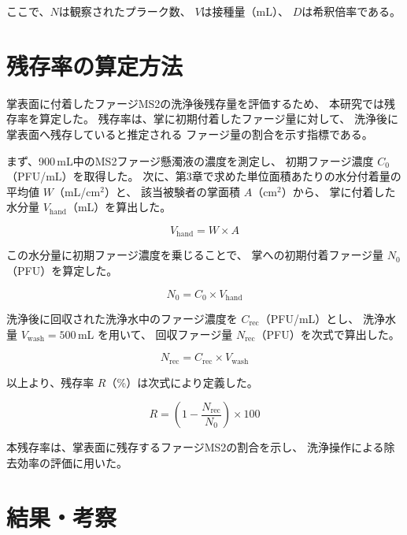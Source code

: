 ここで、$N$は観察されたプラーク数、
$V$は接種量（mL）、
$D$は希釈倍率である。


\section{残存率の算定方法}
掌表面に付着したファージMS2の洗浄後残存量を評価するため、
本研究では残存率を算定した。
残存率は、掌に初期付着したファージ量に対して、
洗浄後に掌表面へ残存していると推定される
ファージ量の割合を示す指標である。

まず、900\,mL中のMS2ファージ懸濁液の濃度を測定し、
初期ファージ濃度 $C_0$（PFU/mL）を取得した。
次に、第3章で求めた単位面積あたりの水分付着量の平均値
$W$（mL/cm$^2$）と、
該当被験者の掌面積 $A$（cm$^2$）から、
掌に付着した水分量 $V_{\mathrm{hand}}$（mL）を算出した。

\begin{equation}
V_{\mathrm{hand}} = W \times A
\end{equation}

この水分量に初期ファージ濃度を乗じることで、
掌への初期付着ファージ量 $N_0$（PFU）を算定した。

\begin{equation}
N_0 = C_0 \times V_{\mathrm{hand}}
\end{equation}

洗浄後に回収された洗浄水中のファージ濃度を
$C_{\mathrm{rec}}$（PFU/mL）とし、
洗浄水量 $V_{\mathrm{wash}} = 500$\,mL を用いて、
回収ファージ量 $N_{\mathrm{rec}}$（PFU）を次式で算出した。

\begin{equation}
N_{\mathrm{rec}} = C_{\mathrm{rec}} \times V_{\mathrm{wash}}
\end{equation}

以上より、残存率 $R$（\%）は次式により定義した。

\begin{equation}
R = \left(1 - \frac{N_{\mathrm{rec}}}{N_0}\right) \times 100
\end{equation}

本残存率は、掌表面に残存するファージMS2の割合を示し、
洗浄操作による除去効率の評価に用いた。

\clearpage
\section{結果・考察}

